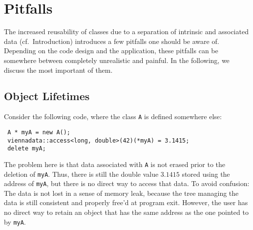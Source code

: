 \chapter{Pitfalls} \label{chap:pitfalls}
The increased reusability of classes due to a separation of intrinsic and associated data (cf.~Introduction)
introduces a few pitfalls one should be aware of. Depending on the code design and the application,
these pitfalls can be somewhere between completely unrealistic and painful. In the following, we discuss the most important of them.

\section{Object Lifetimes}
Consider the following code, where the class \lstinline|A| is defined somewhere else:
\begin{lstlisting}
 A * myA = new A();
 viennadata::access<long, double>(42)(*myA) = 3.1415;
 delete myA;
\end{lstlisting}
The problem here is that data associated with \lstinline|A| is not erased prior to the deletion of \lstinline|myA|.
Thus, there is still the double value $3.1415$ stored using the address of \lstinline|myA|, but there is no direct way to access that data.
To avoid confusion: The data is not lost in a sense of memory leak, because the tree managing the data is still consistent and properly free'd at program exit.
However, the user has no direct way to retain an object that has the same address as the one pointed to by \lstinline|myA|.

